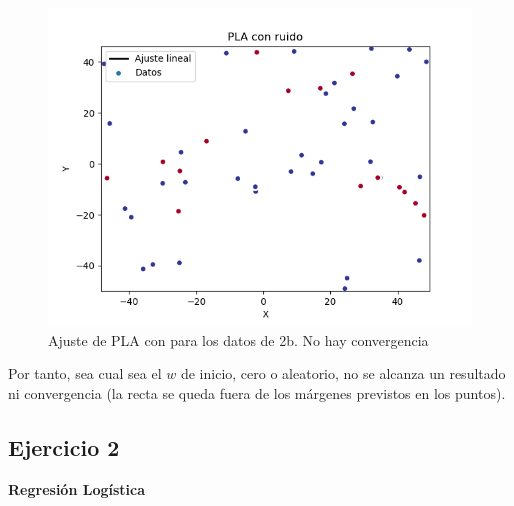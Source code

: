 \begin{itemize}
	
	\begin{figure}[H] %
		\centering
		\includegraphics[scale=0.5]{PLA-ruido.png}  %
		\caption{Ajuste de PLA con para los datos de 2b. No hay convergencia} 
		\label{fig:pla-ruido}
	\end{figure}

	Por tanto, sea cual sea el $w$ de inicio, cero o aleatorio, no se alcanza un resultado ni convergencia (la recta se queda fuera de los márgenes previstos en los puntos).
\end{itemize}


\subsection{Ejercicio 2}

\textbf{Regresión Logística}

